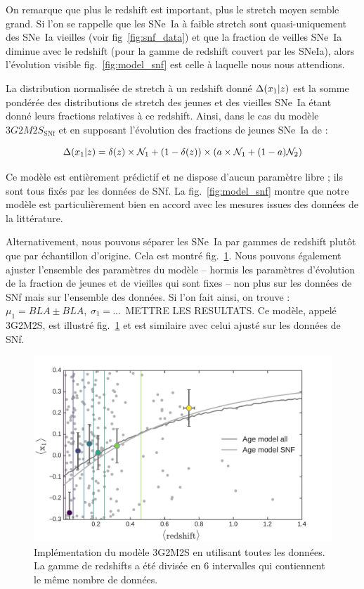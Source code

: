 \documentclass[a4paper, 12pt, svgnames]{article}
\newcommand{\mr}[1]{{\textcolor[rgb]{0.80,0.10,0.1}{#1}}}
\begin{document}
On remarque que plus le redshift est important, plus le stretch moyen semble
grand. Si l'on se rappelle que les SNe~Ia à faible stretch sont quasi-uniquement
des SNe~Ia vieilles (voir fig~\ref{fig:snf_data}) et que la fraction de veilles
SNe~Ia diminue avec le redshift (pour la gamme de redshift couvert par les
SNeIa), alors l'évolution visible fig.~\ref{fig:model_snf} est celle à laquelle
nous nous attendions.

La distribution normalisée de stretch à un redshift donné $\Delta(x_1 | z)$ est la
somme pondérée des distributions de stretch des jeunes et des vieilles SNe~Ia
étant donné leurs fractions relatives à ce redshift. Ainsi, dans le cas du
modèle $3G2M2S_{\mathrm{SNf}}$ et en supposant l'évolution des fractions de
jeunes SNe~Ia de \cite{rigault_strong_2018} :

\begin{equation}
    \Delta(x_1 | z) = \delta(z) \times\mathcal{N}_1 + \left(1-\delta(z)\right)\times \left(a\times\mathcal{N}_1 + (1-a) \mathcal{N}_2\right)
\end{equation}

Ce modèle est entièrement prédictif et ne dispose d'aucun paramètre libre ; ils
sont tous fixés par les données de SNf. La fig.~\ref{fig:model_snf} montre que
notre modèle est particulièrement bien en accord avec les mesures issues des
données de la littérature.

Alternativement, nous pouvons séparer les SNe~Ia par gammes de redshift plutôt
que par échantillon d'origine. Cela est montré fig.~\ref{fig:3G2M2S}. Nous
pouvons également ajuster l'ensemble des paramètres du modèle -- hormis les
paramètres d'évolution de la fraction de jeunes et de vieilles qui sont fixes --
non plus sur les données de SNf mais sur l'ensemble des données. Si l'on fait
ainsi, on trouve : $\mu_1=BLA\pm BLA$, $\sigma_1=...$ \mr{METTRE LES RESULTATS}. Ce
modèle, appelé 3G2M2S, est illustré fig.~\ref{fig:3G2M2S} et est similaire avec
celui ajusté sur les données de SNf.

\begin{figure}[htbp!]
    \centering
    \includegraphics[width=.5\linewidth]{Rapport_figures/model_all.pdf}
    \captionsetup{justification=centering}
    \caption{Implémentation du modèle 3G2M2S en utilisant toutes les données.
    La gamme de redshifts a été divisée en 6 intervalles qui contiennent le même
nombre de données.}
    \label{fig:3G2M2S}
\end{figure}
\end{document}
